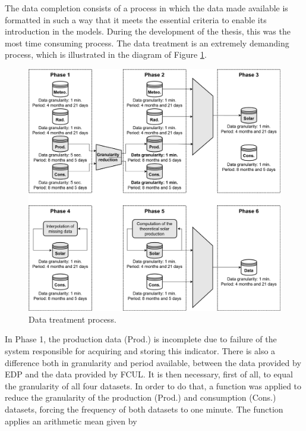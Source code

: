 The data completion consists of a process in which the data made available is formatted in such a way that it meets the essential criteria to enable its introduction in the models. During the development of the thesis, this was the most time consuming process. The data treatment is an extremely demanding process, which is illustrated in the diagram of Figure \ref{datatreatment}.

\begin{figure}[h!]
    \centering
    \begin{center}
    \includegraphics[width=1\textwidth]{Images/Data.png}
    \caption{Data treatment process.}
    \label{datatreatment}
    \end{center}
\end{figure}

In Phase 1, the production data (Prod.) is incomplete due to failure of the system responsible for acquiring and storing this indicator. There is also a difference both in granularity and period available, between the data provided by \ac{EDP} and the data provided by \ac{FCUL}. It is then necessary, first of all, to equal the granularity of all four datasets. In order to do that, a function was applied to reduce the granularity of the production (Prod.) and consumption (Cons.) datasets, forcing the frequency of both datasets to one minute. The function applies an arithmetic mean given by 

